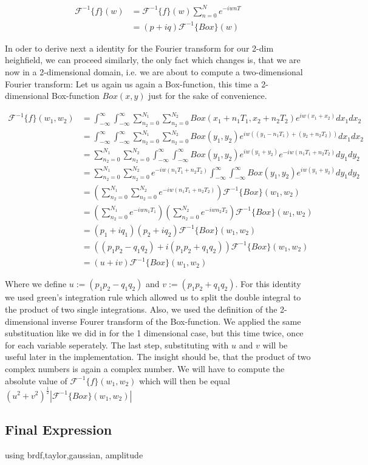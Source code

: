 \begin{align*}
\mathcal{F}^{-1}\{f\}(w)
& =\mathcal{F}^{-1}\{f\}(w) \sum_{n=0}^{N} e^{-iwnT} \\
& = (p+iq) \mathcal{F}^{-1}\{Box\}(w)  
\end{align*}

In oder to derive next a identity for the Fourier transform for our 2-dim heighfield, we can proceed similarly, the only fact which changes is, that we are now in a 2-dimensional domain, i.e. we are about to compute a two-dimensional Fourier transform:
Let us again us again a Box-function, this time a 2-dimensional Box-function $Box(x,y)$ just for the sake of convenience.

\begin{align*}
\mathcal{F}^{-1}\{f\}(w_1,w_2)
& = \int_{-\infty}^{\infty}\int_{-\infty}^{\infty} \sum_{n_2=0}^{N_1} \sum_{n_2=0}^{N_2} Box(x_1 + n_1 T_1, x_2 + n_2 T_2) e^{iw(x_1 + x_2)}dx_1 dx_2 \\
& = \int_{-\infty}^{\infty}\int_{-\infty}^{\infty} \sum_{n_2=0}^{N_1} \sum_{n_2=0}^{N_2} Box(y_1, y_2) e^{iw((y_1 - n_1 T_1) + (y_2 + n_2 T_2))}dx_1 dx_2 \\
& =\sum_{n_2=0}^{N_1} \sum_{n_2=0}^{N_2} \int_{-\infty}^{\infty}\int_{-\infty}^{\infty} Box(y_1, y_2) e^{iw(y_1 + y_2)} e^{-iw(n_1 T_1 + n_2 T_2)}dy_1 dy_2 \\
& =\sum_{n_2=0}^{N_1} \sum_{n_2=0}^{N_2} e^{-iw(n_1 T_1 + n_2 T_2)} \int_{-\infty}^{\infty}\int_{-\infty}^{\infty} Box(y_1, y_2) e^{iw(y_1 + y_2)} dy_1 dy_2 \\
& =\left(\sum_{n_2=0}^{N_1} \sum_{n_2=0}^{N_2} e^{-iw(n_1 T_1 + n_2 T_2)}\right) \mathcal{F}^{-1}\{Box\}(w_1,w_2) \\
& =\left(\sum_{n_2=0}^{N_1} e^{-iw n_1 T_1}\right) \left(\sum_{n_2=0}^{N_2} e^{-iw n_2 T_2}\right) \mathcal{F}^{-1}\{Box\}(w_1,w_2) \\
& =(p_1 + i q_1)(p_2 + i q_2) \mathcal{F}^{-1}\{Box\}(w_1,w_2) \\
& =((p_1 p_2 - q_1 q_2) + i(p_1 p_2 + q_1 q_2)) \mathcal{F}^{-1}\{Box\}(w_1,w_2) \\
& =(u + iv) \mathcal{F}^{-1}\{Box\}(w_1,w_2)
\end{align*}

Where we define $u := (p_1 p_2 - q_1 q_2) $ and $v := (p_1 p_2 + q_1 q_2)$. For this identity we used green's integration rule which allowed us to split the double integral to the product of two single integrations. Also, we used the definition of the 2-dimensional inverse Fourer transform of the Box-function. We applied the same substituation like we did in for the 1 dimensional case, but this time twice, once for each variable seperately. The last step, substituting with $u$ and $v$ will be useful later in the implementation. The insight should be, that the product of two complex numbers is again a complex number. We will have to compute the absolute value of $\mathcal{F}^{-1}\{f\}(w_1,w_2)$ which will then be equal $(u^2 + v^2)^{\frac{1}{2}}\left|\mathcal{F}^{-1}\{Box\}(w_1,w_2)\right|$

\subsection{Final Expression}
using brdf,taylor,gaussian, amplitude
